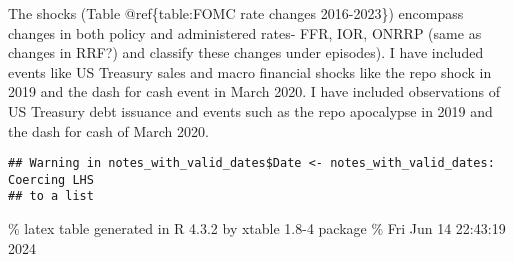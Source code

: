 \documentclass[
]{article}
\begin{document}
The shocks (Table @ref\{table:FOMC rate changes 2016-2023\}) encompass changes in both policy and administered rates- FFR, IOR, ONRRP (same as changes in RRF?) and classify these changes under episodes). I have included events like US Treasury sales and macro financial shocks like the repo shock in 2019 and the dash for cash event in March 2020. I have included observations of US Treasury debt issuance and events such as the repo apocalypse in 2019 and the dash for cash of March 2020.

\begin{verbatim}
## Warning in notes_with_valid_dates$Date <- notes_with_valid_dates: Coercing LHS
## to a list
\end{verbatim}

\% latex table generated in R 4.3.2 by xtable 1.8-4 package
\% Fri Jun 14 22:43:19 2024
\end{document}
